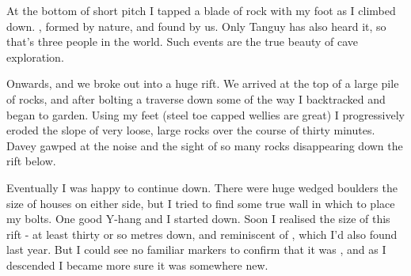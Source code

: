 At the bottom of short pitch I tapped a blade of rock with my foot as I climbed down. , formed by nature, and found by us. Only Tanguy has also heard it, so that's three people in the world. Such events are the true beauty of cave exploration.


Onwards, and we broke out into a huge rift. We arrived at the top of a large pile of rocks, and after bolting a traverse down some of the way I backtracked and began to garden. Using my feet (steel toe capped wellies are great) I progressively eroded the slope of very loose, large rocks over the course of thirty minutes. Davey gawped at the noise and the sight of so many rocks disappearing down the rift below.

Eventually I was happy to continue down. There were huge wedged boulders the size of houses on either side, but I tried to find some true wall in which to place my bolts. One good Y-hang and I started down. Soon I realised the size of this rift - at least thirty or so metres down, and reminiscent of , which I'd also found last year. But I could see no familiar markers to confirm that it was , and as I descended I became more sure it was somewhere new.

